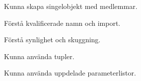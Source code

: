 
\item Kunna skapa singelobjekt med medlemmar.
\item Förstå kvalificerade namn och import.
\item Förstå synlighet och skuggning.
\item Kunna använda tupler.
\item Kunna använda uppdelade parameterlistor.
